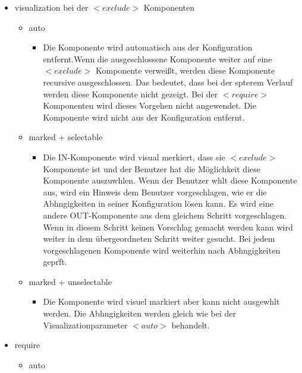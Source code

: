 \documentclass{article}
\begin{document}
\begin{itemize}
    \item visualization bei der $<exclude>$ Komponenten
    \begin{itemize}
        \item auto
        \begin{itemize}
            \item Die Komponente wird automatisch aus der Konfiguration
            entfernt.Wenn die ausgeschlossene Komponente weiter auf
            eine $<exclude>$ Komponente verwei\ss{}t, werden diese Komponente
            recursive ausgeschlossen. Das
            bedeutet, dass bei der spterem Verlauf werden diese
            Komponente nicht gezeigt. Bei der $<require>$ Komponenten
            wird dieses Vorgehen nicht angewendet. Die Komponente wird nicht aus der
            Konfiguration entfernt.
        \end{itemize}
        \item marked + selectable
        \begin{itemize}
            \item Die IN-Komponente wird visual merkiert, dass sie
            $<exclude>$ Komponente ist und der Benutzer hat die
            M\"oglichkeit diese Komponente auszuwhlen.
            Wenn der Benutzer whlt diese Komponente aus, wird ein
            Hinweis dem Benutzer vorgeschlagen, wie er die Abhngigkeiten
            in seiner Konfiguration l\"osen kann. Es wird eine andere
            OUT-Komponente aus dem gleichem Schritt vorgeschlagen. Wenn in
            diesem Schritt keinen Vorschlag gemacht werden kann wird weiter
            in dem übergeordneten Schritt weiter gesucht. Bei jedem
            vorgeschlagenen Komponente wird weiterhin nach Abhngigkeiten
            gepr\"ft.
        \end{itemize}
        \item marked + unselectable
        \begin{itemize}
            \item Die Komponente wird visuel markiert aber kann nicht
            ausgewhlt werden. Die Abhngigkeiten werden gleich wie bei der
            Visualizationparameter $<auto>$ behandelt.
        \end{itemize}
    \end{itemize}
    \item require
    \begin{itemize}
        \item auto
        \begin{itemize}

\end{itemize}
\end{itemize}
\end{itemize}
\end{document}
